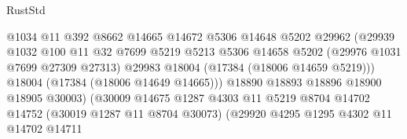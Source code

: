 \begin{lexlean}{RustStd}
\begin{coremodule}
                                            @1034
                                            @11
                                            @392
                                            @8662
                                            @14665
                                            @14672
                                            @5306
                                            @14648
                                            @5202
                                            @29962
                                            (@29939
                                              @1032
                                              @100
                                              @11
                                              @32
                                              @7699
                                              @5219
                                              @5213
                                              @5306
                                              @14658
                                              @5202
                                              (@29976 @1031 @7699 @27309 @27313)
                                              @29983
                                              @18004
                                              (@17384 (@18006 @14659 @5219)))
                                            @18004
                                            (@17384 (@18006 @14649 @14665)))
                                          @18890
                                          @18893
                                          @18896
                                          @18900
                                          @18905
                                          @30003)
                                        (@30009
                                          @14675
                                          @1287
                                          @4303
                                          @11
                                          @5219
                                          @8704
                                          @14702
                                          @14752
                                          (@30019 @1287 @11 @8704 @30073)
                                          (@29920
                                            @4295
                                            @1295
                                            @4302
                                            @11
                                            @14702
                                            @14711

\end{coremodule}
\end{lexlean}
